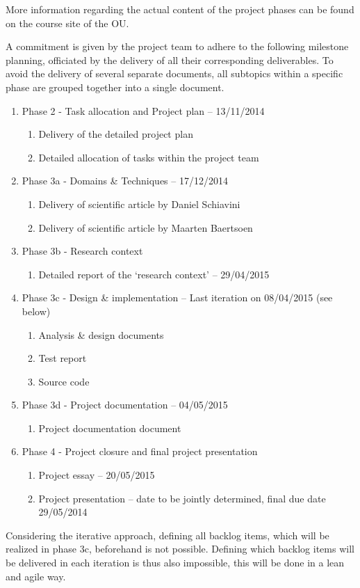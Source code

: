 More information regarding the actual content of the project phases can be found on the course site of the OU. 

A commitment is given by the project team to adhere to the following milestone planning, officiated by the delivery of all their corresponding deliverables. To avoid the delivery of several separate documents, all subtopics within a specific phase are grouped together into a single document.

 \begin{enumerate}
	\item Phase 2 - Task allocation and Project plan			-- 	13/11/2014
 	\begin{enumerate}
		\item Delivery of the detailed project plan 			
		\item Detailed allocation of tasks within the project team 
	\end {enumerate}
	\item Phase 3a - Domains \& Techniques					-- 	17/12/2014
 	\begin{enumerate}
		\item Delivery of scientific article by Daniel Schiavini
		\item Delivery of scientific article by Maarten Baertsoen
	\end {enumerate}
 	\item Phase 3b - Research context
 	\begin{enumerate}
		\item Detailed report of the `research context'  		-- 	29/04/2015
	\end {enumerate}
 	\item Phase 3c - Design \& implementation				-- Last iteration on 08/04/2015 (see below)
 	\begin{enumerate}
		\item Analysis \& design documents
		\item Test report
		\item Source code
	\end {enumerate}
 	\item Phase 3d - Project documentation					-- 	04/05/2015
 	\begin{enumerate}
		\item Project documentation document	
	\end {enumerate}
	\item Phase 4 - Project closure and final project presentation
 	\begin{enumerate}
		\item Project essay							-- 	20/05/2015
		\item Project presentation						-- 	date to be jointly determined, final due date 29/05/2014
	\end {enumerate}
\end {enumerate}
%
Considering the iterative approach, defining all backlog items, which will be realized in phase 3c, beforehand is not possible.
Defining which backlog items will be delivered in each iteration is thus also impossible, this will be done in a lean and agile way.

